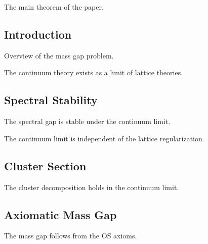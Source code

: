 \begin{theorem}
\label{thm:main}
The main theorem of the paper.
\end{theorem}

\subsection{Introduction}
\label{sec:intro}

Overview of the mass gap problem.

\begin{theorem}
\label{thm:continuum-from-lattice}
The continuum theory exists as a limit of lattice theories.
\end{theorem}

\subsection{Spectral Stability}
\label{sec:spectral-stability}

\begin{theorem}
The spectral gap is stable under the continuum limit.
\end{theorem}

\begin{theorem}[Universality]
\label{thm:universality}
The continuum limit is independent of the lattice regularization.
\end{theorem}

\subsection{Cluster Section}
\label{sec:cluster}

\begin{theorem}
The cluster decomposition holds in the continuum limit.
\end{theorem}

\subsection{Axiomatic Mass Gap}
\label{sec:axiomatic-mass-gap}

\begin{theorem}
The mass gap follows from the OS axioms.
\end{theorem}

